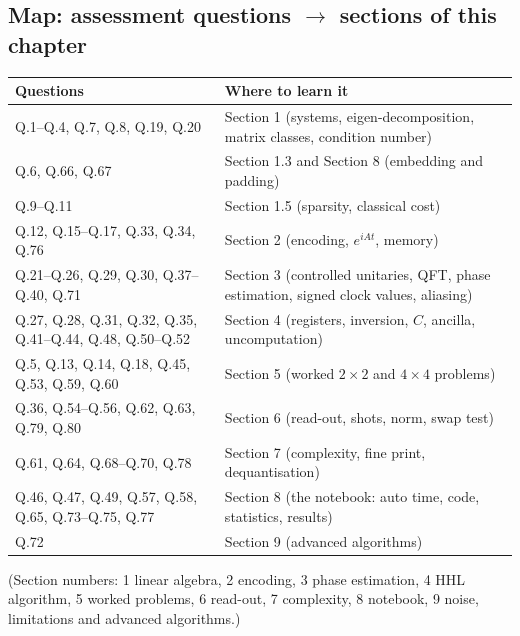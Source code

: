 \documentclass[11pt,a4paper,openany]{book}
\begin{document}
\subsection{Map: assessment questions $\to$ sections of this chapter}
\begin{tabularx}{\linewidth}{@{}>{\raggedright\arraybackslash}p{5.6cm}>{\raggedright\arraybackslash}X@{}}
\toprule
\textbf{Questions} & \textbf{Where to learn it}\\ \midrule
Q.1--Q.4, Q.7, Q.8, Q.19, Q.20 & Section 1 (systems, eigen-decomposition, matrix classes, condition number)\\
Q.6, Q.66, Q.67 & Section 1.3 and Section 8 (embedding and padding)\\
Q.9--Q.11 & Section 1.5 (sparsity, classical cost)\\
Q.12, Q.15--Q.17, Q.33, Q.34, Q.76 & Section 2 (encoding, $e^{iAt}$, memory)\\
Q.21--Q.26, Q.29, Q.30, Q.37--Q.40, Q.71 & Section 3 (controlled unitaries, QFT, phase estimation, signed clock values, aliasing)\\
Q.27, Q.28, Q.31, Q.32, Q.35, Q.41--Q.44, Q.48, Q.50--Q.52 & Section 4 (registers, inversion, $C$, ancilla, uncomputation)\\
Q.5, Q.13, Q.14, Q.18, Q.45, Q.53, Q.59, Q.60 & Section 5 (worked $2\times2$ and $4\times4$ problems)\\
Q.36, Q.54--Q.56, Q.62, Q.63, Q.79, Q.80 & Section 6 (read-out, shots, norm, swap test)\\
Q.61, Q.64, Q.68--Q.70, Q.78 & Section 7 (complexity, fine print, dequantisation)\\
Q.46, Q.47, Q.49, Q.57, Q.58, Q.65, Q.73--Q.75, Q.77 & Section 8 (the notebook: auto time, code, statistics, results)\\
Q.72 & Section 9 (advanced algorithms)\\
\bottomrule
\end{tabularx}
{\small (Section numbers: 1 linear algebra, 2 encoding, 3 phase estimation, 4 HHL algorithm, 5 worked problems, 6 read-out, 7 complexity,
8 notebook, 9 noise, limitations and advanced algorithms.)}

\end{document}
